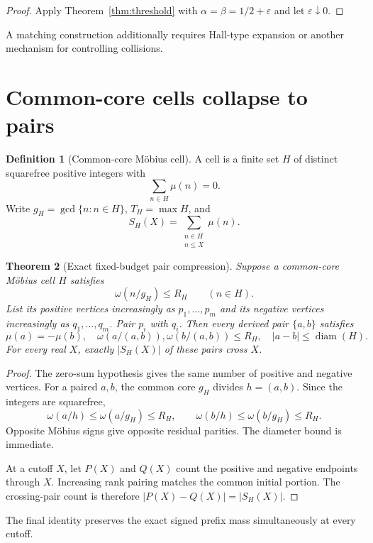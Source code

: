 \documentclass[11pt,a4paper]{amsart}
\newtheorem{theorem}{Theorem}[section]
\theoremstyle{definition}
\newtheorem{definition}[theorem]{Definition}
\theoremstyle{remark}
\newcommand{\mob}{\mu}
\newcommand{\om}{\omega}
\begin{document}
\begin{proof}
Apply Theorem~\ref{thm:threshold} with
$\alpha=\beta=1/2+\varepsilon$ and let $\varepsilon\downarrow0$.
\end{proof}

A matching construction additionally requires Hall-type expansion or another
mechanism for controlling collisions.

\section{Common-core cells collapse to pairs}

\begin{definition}[Common-core M\"obius cell]
A cell is a finite set $H$ of distinct squarefree positive integers with
\[
 \sum_{n\in H}\mob(n)=0.
\]
Write $g_H=\gcd\{n:n\in H\}$, $T_H=\max H$, and
\[
 S_H(X)=\sum_{\substack{n\in H\\ n\leq X}}\mob(n).
\]
\end{definition}

\begin{theorem}[Exact fixed-budget pair compression]\label{thm:compression}
Suppose a common-core M\"obius cell $H$ satisfies
\[
 \om(n/g_H)\leq R_H\qquad(n\in H).
\]
List its positive vertices increasingly as $p_1,\ldots,p_m$ and its negative
vertices increasingly as $q_1,\ldots,q_m$.  Pair $p_i$ with $q_i$.  Then
every derived pair $\{a,b\}$ satisfies
\[
 \mob(a)=-\mob(b),\quad
 \om(a/(a,b)),\om(b/(a,b))\leq R_H,\quad
 |a-b|\leq\operatorname{diam}(H).
\]
For every real $X$, exactly $|S_H(X)|$ of these pairs cross $X$.
\end{theorem}

\begin{proof}
The zero-sum hypothesis gives the same number of positive and negative
vertices.  For a paired $a,b$, the common core $g_H$ divides $h=(a,b)$.
Since the integers are squarefree,
\[
 \om(a/h)\leq\om(a/g_H)\leq R_H,
 \qquad
 \om(b/h)\leq\om(b/g_H)\leq R_H.
\]
Opposite M\"obius signs give opposite residual parities.  The diameter bound
is immediate.

At a cutoff $X$, let $P(X)$ and $Q(X)$ count the positive and negative
endpoints through $X$.  Increasing rank pairing matches the common initial
portion.  The crossing-pair count is therefore
$|P(X)-Q(X)|=|S_H(X)|$.
\end{proof}

The final identity preserves the exact signed prefix mass simultaneously at
every cutoff.
\end{document}
